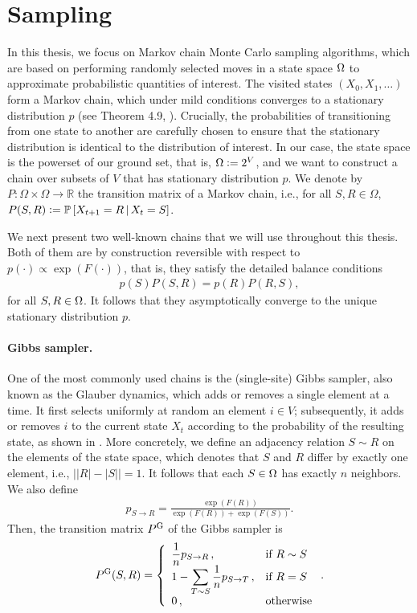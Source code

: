 \section{Sampling} \label{sect:sampling}
In this thesis, we focus on Markov chain Monte Carlo sampling algorithms, which are based on performing randomly selected moves in a state space $\ss$ to approximate probabilistic quantities of interest.
The visited states $(X_0, X_1,\ldots)$ form a Markov chain, which under mild conditions converges to a stationary distribution $p$ (see Theorem 4.9, \citealp{levin08book}).
Crucially, the probabilities of transitioning from one state to another are carefully chosen to ensure that the stationary distribution is identical to the distribution of interest.
In our case, the state space is the powerset of our ground set, that is, $\ss \defeq 2^V$, and we want to construct a chain over subsets of $V$ that has stationary distribution $p$.
We denote by $P : \Omega \times \Omega \to \mathbb{R}$ the transition matrix of a Markov chain, i.e., for all $S, R \in \Omega$, $P(S, R) \defeq \P\left[ X_{t+1} = R \,|\, X_t = S \right]$.

We next present two well-known chains that we will use throughout this thesis.
Both of them are by construction reversible with respect to $p(\cdot) \propto \exp(F(\cdot))$, that is, they satisfy the detailed balance conditions
\begin{align*}
p(S) P(S, R) = p(R) P(R, S),
\end{align*}
for all $S, R \in \ss$.
It follows that they asymptotically converge to the unique stationary distribution $p$.

\paragraph{Gibbs sampler.}
One of the most commonly used chains is the (single-site) Gibbs sampler, also known as the Glauber dynamics, which adds or removes a single element at a time.
It first selects uniformly at random an element $i \in V$; subsequently, it adds or removes $i$ to the current state $X_t$ according to the probability of the resulting state, as shown in .
More concretely, we define an adjacency relation $S \sim R$ on the elements of the state space, which denotes that $S$ and $R$ differ by exactly one element, i.e., $\big||R| - |S|\big| = 1$.
It follows that each $S \in \ss$ has exactly $n$ neighbors.
We also define
\begin{align*}
p_{S \rightarrow R} = \displaystyle\frac{\exp(F(R))}{\exp(F(R)) + \exp(F(S))}.
\end{align*}
Then, the transition matrix $\Pg$ of the Gibbs sampler is
\begin{align*}
  \Pg(S, R) = 
  \threepartdefo{\displaystyle\frac{1}{n}p_{S \rightarrow R}}{R \sim S}{1 - \displaystyle\sum_{T \sim S} \displaystyle\frac{1}{n}p_{S \rightarrow T}}{R = S}{0}.
\end{align*}

